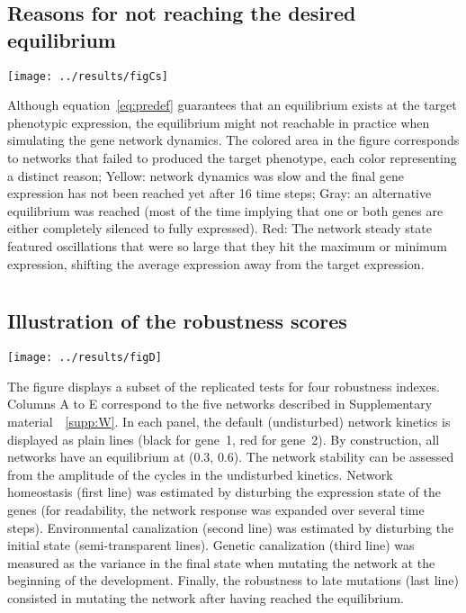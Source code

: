\documentclass[a4paper]{article}
\newcommand{\SupMat}{Supplementary material~}
\begin{document}
\begin{appendices}
    \subsection*{Reasons for not reaching the desired equilibrium}

	\texttt{[image: ../results/figCs]}
	
	Although equation~\ref{eq:predef} guarantees that an equilibrium exists at the target phenotypic expression, the equilibrium might not reachable in practice when simulating the gene network dynamics. The colored area in the figure corresponds to networks that failed to produced the target phenotype, each color representing a distinct reason; Yellow: network dynamics was slow and the final gene expression has not been reached yet after 16 time steps; Gray: an alternative equilibrium was reached (most of the time implying that one or both genes are either completely silenced to fully expressed). Red: The network steady state featured oscillations that were so large that they hit the maximum or minimum expression, shifting the average expression away from the target expression. 

  \clearpage


  \clearpage
  \section{}
    \label{supp:simpanels}
    \subsection*{Illustration of the robustness scores}

	\texttt{[image: ../results/figD]}
	
	The figure displays a subset of the replicated tests for four robustness indexes. Columns A to E correspond to the five networks described in \SupMat~\ref{supp:W}. In each panel, the default (undisturbed) network kinetics is displayed as plain lines (black for gene~1, red for gene~2). By construction, all networks have an equilibrium at (0.3, 0.6). The network stability can be assessed from the amplitude of the cycles in the undisturbed kinetics. Network homeostasis (first line) was estimated by disturbing the expression state of the genes (for readability, the network response was expanded over several time steps). Environmental canalization (second line) was estimated by disturbing the initial state (semi-transparent lines). Genetic canalization (third line) was measured as the variance in the final state when mutating the network at the beginning of the development. Finally, the robustness to late mutations (last line) consisted in mutating the network after having reached the equilibrium.



\end{appendices}
\end{document}
